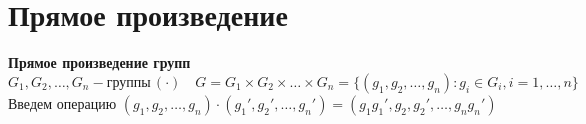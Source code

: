 \documentclass[12pt]{article}
\begin{document}
		
		
		\newpage
		\section{Прямое произведение}
		
			\begin{Def}
				\textbf{Прямое произведение групп} \\
				$G_1, G_2, \dots , G_n - \text{группы} \, (\cdot) \quad G=G_1\times G_2 \times \dots \times G_n=\{ (g_1,g_2, \dots , g_n):g_i\in G_i, i=1, \dots , n  \}$ \\
				Введем операцию $(g_1,g_2, \dots , g_n) \cdot (g_1',g_2', \dots , g_n')=(g_1 g_1', g_2, g_2', \dots, g_n g_n') $
			\end{Def}
			
				
				
				
				
				
\end{document}
